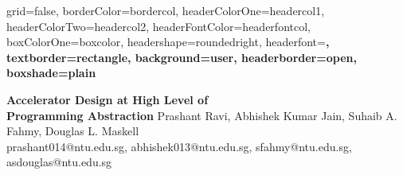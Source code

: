\documentclass[a0paper,portrait]{baposter}
\begin{document}


\begin{poster}{
	grid=false,
	borderColor=bordercol,
	headerColorOne=headercol1,
	headerColorTwo=headercol2,
	headerFontColor=headerfontcol,
	boxColorOne=boxcolor,
	headershape=roundedright,
	headerfont=\large\sf\bf,
	textborder=rectangle,
	background=user,
	headerborder=open,
  boxshade=plain
}
{
	\setlength\fboxsep{0pt}
	\setlength\fboxrule{0pt}
	
}
{\huge\sf\bf
Accelerator Design at High Level of \\ Programming Abstraction 
}
{
	\vspace{0.3em} Prashant Ravi, Abhishek Kumar Jain, Suhaib A. Fahmy, Douglas L. Maskell\\
	{\smaller prashant014@ntu.edu.sg, abhishek013@ntu.edu.sg, sfahmy@ntu.edu.sg, asdouglas@ntu.edu.sg}
}




\end{poster}
\end{document}
